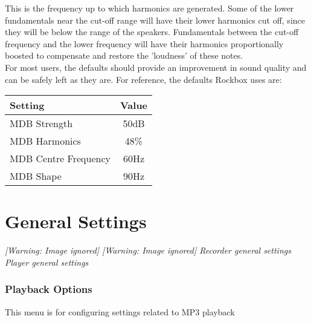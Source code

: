 \begin{itemize}
{\begin{itemize}
This is the frequency up to which harmonics are generated.  Some of the
lower fundamentals near the cut{}-off range
will have their lower harmonics cut off, since they will be below the
range of the speakers. Fundamentals between the
cut{}-off frequency and the lower frequency will have their harmonics proportionally boosted to compensate and restore the 'loudness' of these
notes.\\

For most users, the defaults should provide an improvement in sound
quality and can be safely left as they are.  For reference, the
defaults Rockbox uses are:

\begin{table}[h!]
  \begin{center}
    \begin{tabular}{@{}lc@{}}\toprule
      Setting & Value \\\midrule
      MDB Strength & 50dB \\
      MDB Harmonics & 48\% \\
      MDB Centre Frequency & 60Hz \\
      MDB Shape & 90Hz \\\bottomrule
    \end{tabular}
  \end{center}
\end{table}

\end{itemize}
}
\end{itemize}


\section{\label{ref:GeneralSettings}General Settings}
{\centering\mdseries\itshape
  [Warning: Image ignored] %
     [Warning: Image ignored] %
 \newline
Recorder general settings  Player general settings  
\par}

\subsubsection{\label{ref:PlaybackOptions}Playback Options}
This menu is for configuring settings related to MP3 playback

